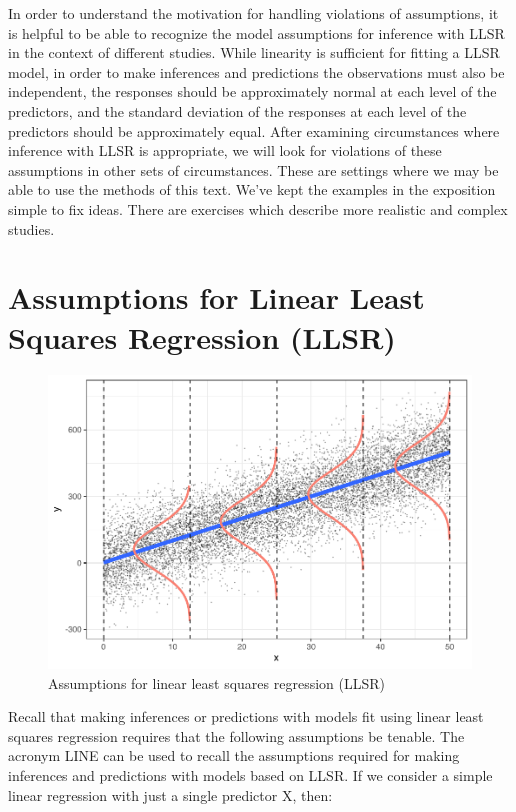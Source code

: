 \documentclass[
]{krantz}
\begin{document}
In order to understand the motivation for handling violations of assumptions, it is helpful to be able to recognize the model assumptions for inference with LLSR in the context of different studies. While linearity is sufficient for fitting a LLSR model, in order to make inferences and predictions the observations must also be independent, the responses should be approximately normal at each level of the predictors, and the standard deviation of the responses at each level of the predictors should be approximately equal. After examining circumstances where inference with LLSR is appropriate, we will look for violations of these assumptions in other sets of circumstances. These are settings where we may be able to use the methods of this text. We've kept the examples in the exposition simple to fix ideas. There are exercises which describe more realistic and complex studies.

\hypertarget{assumptions-for-linear-least-squares-regression-llsr}{%
\section{Assumptions for Linear Least Squares Regression (LLSR)}\label{assumptions-for-linear-least-squares-regression-llsr}}

\begin{figure}

{\centering \includegraphics[width=0.9\linewidth]{bookdown-BeyondMLR_files/figure-latex/OLSassumptions-1} 

}

\caption{Assumptions for linear least squares regression (LLSR)}\label{fig:OLSassumptions}
\end{figure}

Recall that making inferences or predictions with models fit using linear least squares regression  requires that the following assumptions be tenable. The acronym LINE can be used to recall the assumptions required for making inferences and predictions with models based on LLSR. If we consider a simple linear regression  with just a single predictor X, then:
\end{document}
